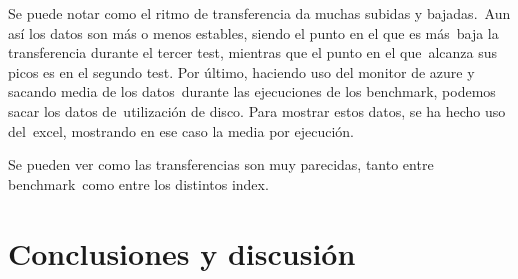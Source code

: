 \documentclass[11pt,twoside,a4paper]{book}
\begin{document}
%
Se puede notar como el ritmo de transferencia da muchas subidas y bajadas.\
Aun así los datos son más o menos estables, siendo el punto en el que es más\
baja la transferencia durante el tercer test, mientras que el punto en el que\
alcanza sus picos es en el segundo test. \newline
Por último, haciendo uso del monitor de azure y sacando media de los datos\
durante las ejecuciones de los benchmark, podemos sacar los datos de\
utilización de disco. Para mostrar estos datos, se ha hecho uso del\
excel, mostrando en ese caso la media por ejecución.

%
%
Se pueden ver como las transferencias son muy parecidas, tanto entre benchmark\
como entre los distintos index.

\chapter{Conclusiones y discusión}
\end{document}
